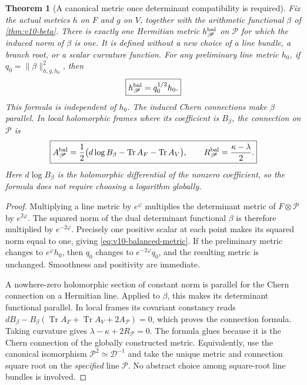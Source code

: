 \documentclass[11pt]{article}
\newtheorem{theorem}{Theorem}[section]
\theoremstyle{definition}
\theoremstyle{remark}
\newcommand{\Tr}{\operatorname{Tr}}
\begin{document}
\begin{theorem}[A canonical metric once determinant compatibility is required]
\label{thm:v10-balanced-metric}
Fix the actual metrics $h$ on $F$ and $g$ on $V$, together with the
arithmetic functional $\beta$ of \cref{thm:v10-beta}. There is exactly
one Hermitian metric $h_{\mathscr P}^{\rm bal}$ on $\mathscr P$ for
which the induced norm of $\beta$ is one. It is defined without a new
choice of a line bundle, a branch root, or a scalar curvature function.
For any preliminary line metric $h_0$, if
$q_0=\|\beta\|^2_{h,g,h_0}$, then
\begin{equation}
 \boxed{h_{\mathscr P}^{\rm bal}=q_0^{1/2}h_0.}
 \label{eq:v10-balanced-metric}
\end{equation}
This formula is independent of $h_0$. The induced Chern connections make
$\beta$ parallel. In local holomorphic frames where its coefficient is
$B_\beta$, the connection on $\mathscr P$ is
\begin{equation}
 \boxed{A_{\mathscr P}^{\rm bal}
 =\frac12\bigl(d\log B_\beta-\Tr A_F-\Tr A_V\bigr),\qquad
 R_{\mathscr P}^{\rm bal}=\frac{\kappa-\lambda}{2}.}
 \label{eq:v10-balanced-connection}
\end{equation}
Here $d\log B_\beta$ is the holomorphic differential of the nonzero
coefficient, so the formula does not require choosing a logarithm globally.
\end{theorem}
\begin{proof}
Multiplying a line metric by $e^\varphi$ multiplies the determinant
metric of $F\otimes\mathscr P$ by $e^{2\varphi}$. The squared norm
of the dual determinant functional $\beta$ is therefore multiplied by
$e^{-2\varphi}$. Precisely one positive scalar at each point makes its
squared norm equal to one, giving \cref{eq:v10-balanced-metric}.
If the preliminary metric changes to $e^\varphi h_0$, then
$q_0$ changes to $e^{-2\varphi}q_0$, and the resulting metric is
unchanged. Smoothness and positivity are immediate.

A nowhere-zero holomorphic section of constant norm is parallel for the
Chern connection on a Hermitian line. Applied to $\beta$, this makes
its determinant functional parallel. In local frames its covariant
constancy reads
$dB_\beta-B_\beta(\Tr A_F+\Tr A_V+2A_{\mathscr P})=0$,
which proves the connection formula. Taking curvature gives
$\lambda-\kappa+2R_{\mathscr P}=0$.
The formula glues because it is the Chern connection of the globally
constructed metric. Equivalently, use the canonical isomorphism
$\mathscr P^2\simeq\mathscr D^{-1}$ and take the unique metric and
connection square root on the \emph{specified} line $\mathscr P$.
No abstract choice among square-root line bundles is involved.
\end{proof}
\end{document}
